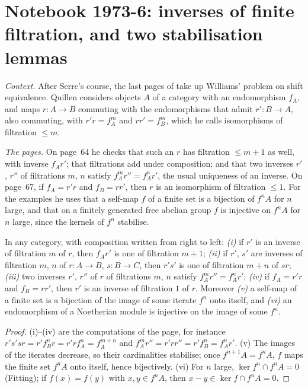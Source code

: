 \section[Notebook 1973-6: shift equivalences]{Notebook 1973-6: inverses of finite filtration, and two stabilisation lemmas\protect{}}\label{sec:quillen-1973-6-shift}

\emph{Context.} After Serre's course, the last pages of  take up Williams' problem on shift equivalence. Quillen considers objects $A$ of a category with an endomorphism $f_A$, and maps $r \colon A \to B$ commuting with the endomorphisms that admit $r' \colon B \to A$, also commuting, with $r'r = f_A^m$ and $rr' = f_B^m$, which he calls isomorphisms of filtration $\le m$.

\emph{The pages.} On page~64 he checks that such an $r$ has filtration $\le m + 1$ as well, with inverse $f_Ar'$; that filtrations add under composition; and that two inverses $r'$, $r''$ of filtrations $m$, $n$ satisfy $f_A^mr'' = f_A^nr'$, the usual uniqueness of an inverse. On page~67, if $f_A = r'r$ and $f_B = rr'$, then $r$ is an isomorphism of filtration $\le 1$. For the examples he uses that a self-map $f$ of a finite set is a bijection of $f^nA$ for $n$ large, and that on a finitely generated free abelian group $f$ is injective on $f^nA$ for $n$ large, since the kernels of $f^n$ stabilise.

\begin{encadre}
\begin{theoreme}\label{thm:quillen-1973-6-shift}
In any category, with composition written from right to left: \emph{(i)} if $r'$ is an inverse of filtration $m$ of $r$, then $f_Ar'$ is one of filtration $m+1$; \emph{(ii)} if $r'$, $s'$ are inverses of filtration $m$, $n$ of $r \colon A \to B$, $s \colon B \to C$, then $r's'$ is one of filtration $m + n$ of $sr$; \emph{(iii)} two inverses $r'$, $r''$ of $r$ of filtrations $m$, $n$ satisfy $f_A^mr'' = f_A^nr'$; \emph{(iv)} if $f_A = r'r$ and $f_B = rr'$, then $r'$ is an inverse of filtration $1$ of $r$. Moreover \emph{(v)} a self-map of a finite set is a bijection of the image of some iterate $f^n$ onto itself, and \emph{(vi)} an endomorphism of a Noetherian module is injective on the image of some $f^n$.
\end{theoreme}
\end{encadre}

\begin{proof}
(i)--(iv) are the computations of the page, for instance $r's'sr = r'f_B^nr = r'rf_A^n = f_A^{m+n}$ and $f_A^mr'' = r'rr'' = r'f_B^n = f_A^nr'$. (v) The images of the iterates decrease, so their cardinalities stabilise; once $f^{n+1}A = f^nA$, $f$ maps the finite set $f^nA$ onto itself, hence bijectively. (vi) For $n$ large, $\ker f^n \cap f^nA = 0$ (Fitting); if $f(x) = f(y)$ with $x, y \in f^{n}A$, then $x - y \in \ker f \cap f^{n}A = 0$.
\end{proof}

